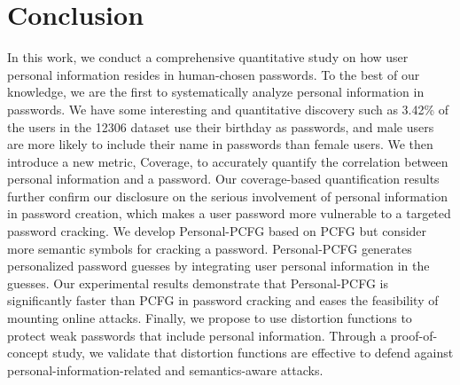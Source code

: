 \section{Conclusion}
\label{sec:conclusion}
In this work, we conduct a comprehensive quantitative study on how
user personal information resides in human-chosen passwords. To the
best of our knowledge, we are the first to systematically analyze
personal information in passwords. We have some interesting and
quantitative discovery such as 3.42\% of the users in the 12306 dataset
use their birthday as passwords, and male users are more likely
to include their name in passwords than female users. We then introduce
a new metric, Coverage, to accurately quantify the correlation between personal information and a password. 
Our coverage-based quantification results further confirm our disclosure on the serious involvement of personal information in password creation, which makes a user password more vulnerable to a targeted password cracking.
We develop Personal-PCFG based on PCFG but consider more semantic symbols for cracking a password. Personal-PCFG generates personalized password guesses by integrating user personal information in the guesses. Our experimental results demonstrate that Personal-PCFG
is significantly faster than PCFG in password cracking and eases the feasibility of mounting online attacks.
Finally, we propose to use distortion functions to protect weak passwords that include personal information. Through a proof-of-concept study, we validate that distortion
functions are effective to defend against personal-information-related and semantics-aware attacks.
